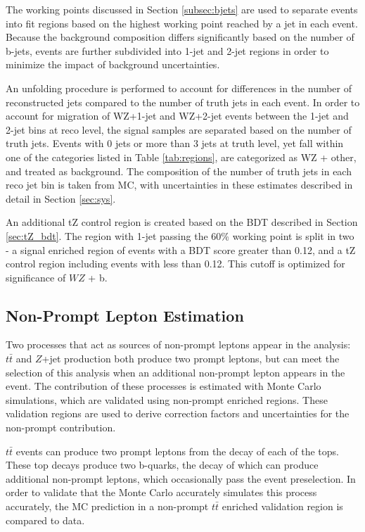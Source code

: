 The working points discussed in Section \ref{subsec:bjets} are used to separate events into fit regions based on the highest working point reached by a jet in each event. Because the background composition differs significantly based on the number of b-jets, events are further subdivided into 1-jet and 2-jet regions in order to minimize the impact of background uncertainties.

An unfolding procedure is performed to account for differences in the number of reconstructed jets compared to the number of truth jets in each event. In order to account for migration of WZ+1-jet and WZ+2-jet events between the 1-jet and 2-jet bins at reco level, the signal samples are separated based on the number of truth jets. Events with 0 jets or more than 3 jets at truth level, yet fall within one of the categories listed in Table \ref{tab:regions}, are categorized as WZ + other, and treated as background. The composition of the number of truth jets in each reco jet bin is taken from MC, with uncertainties in these estimates described in detail in Section \ref{sec:sys}. 

An additional tZ control region is created based on the BDT described in Section \ref{sec:tZ_bdt}. The region with 1-jet passing the 60\% working point is split in two - a signal enriched region of events with a BDT score greater than 0.12, and a tZ control region including events with less than 0.12. This cutoff is optimized for significance of $WZ$ + b.

\subsection{Non-Prompt Lepton Estimation}
\label{sec:fakes}

Two processes that act as sources of non-prompt leptons appear in the analysis: $t\bar{t}$ and $Z$+jet production both produce two prompt leptons, but can meet the selection of this analysis when an additional non-prompt lepton appears in the event. The contribution of these processes is estimated with Monte Carlo simulations, which are validated using non-prompt enriched regions. These validation regions are used to derive correction factors and uncertainties for the non-prompt contribution.

$t\bar{t}$ events can produce two prompt leptons from the decay of each of the tops. These top decays produce two b-quarks, the decay of which can produce additional non-prompt leptons, which occasionally pass the event preselection. In order to validate that the Monte Carlo accurately simulates this process accurately, the MC prediction in a non-prompt $t\bar{t}$ enriched validation region is compared to data.

